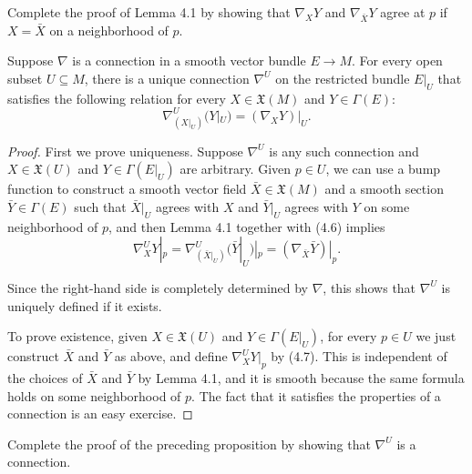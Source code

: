 \begin{exercise}\label{exer:lemma-4-1-comparison}
Complete the proof of Lemma 4.1 by showing that $\nabla_X Y$ and $\nabla_{\bar{X}} Y$ agree at $p$ if $X = \bar{X}$ on a neighborhood of $p$.
\end{exercise}

\begin{proposition}\label{prop:connection-restriction}
Suppose $\nabla$ is a connection in a smooth vector bundle $E \to M$. For every open subset $U \subseteq M$, there is a unique connection $\nabla^U$ on the restricted bundle $E|_U$ that satisfies the following relation for every $X \in \mathfrak{X}(M)$ and $Y \in \Gamma(E)$:
\begin{equation}
\nabla^U_{(X|_U)}(Y|_U) = (\nabla_X Y)|_U. \tag{4.6}
\end{equation}
\end{proposition}

\begin{proof}
First we prove uniqueness. Suppose $\nabla^U$ is any such connection and $X \in \mathfrak{X}(U)$ and $Y \in \Gamma(E|_U)$ are arbitrary. Given $p \in U$, we can use a bump function to construct a smooth vector field $\bar{X} \in \mathfrak{X}(M)$ and a smooth section $\bar{Y} \in \Gamma(E)$ such that $\bar{X}|_U$ agrees with $X$ and $\bar{Y}|_U$ agrees with $Y$ on some neighborhood of $p$, and then Lemma 4.1 together with (4.6) implies
\begin{equation}
\nabla^U_X Y|_p = \nabla^U_{(\bar{X}|_U)}(\bar{Y}|_U)|_p = (\nabla_{\bar{X}} \bar{Y})|_p. \tag{4.7}
\end{equation}

Since the right-hand side is completely determined by $\nabla$, this shows that $\nabla^U$ is uniquely defined if it exists.

To prove existence, given $X \in \mathfrak{X}(U)$ and $Y \in \Gamma(E|_U)$, for every $p \in U$ we just construct $\bar{X}$ and $\bar{Y}$ as above, and define $\nabla^U_X Y|_p$ by (4.7). This is independent of the choices of $\bar{X}$ and $\bar{Y}$ by Lemma 4.1, and it is smooth because the same formula holds on some neighborhood of $p$. The fact that it satisfies the properties of a connection is an easy exercise.
\end{proof}

\begin{exercise}\label{exer:connection-restriction-is-connection}
Complete the proof of the preceding proposition by showing that $\nabla^U$ is a connection.
\end{exercise}

